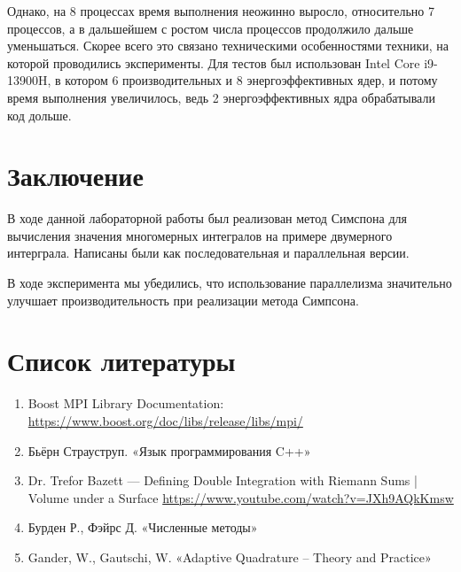 \documentclass[12pt,a4paper]{article}
\begin{document}
Однако, на 8 процессах время выполнения неожинно выросло, относительно 7 процессов, а в дальшейшем с ростом числа процессов продолжило дальше уменьшаться. Скорее всего это связано техническими особенностями техники, на которой проводились эксперименты. Для тестов был использован Intel Core i9-13900H, в котором 6 производительных и 8 энергоэффективных ядер, и потому время выполнения увеличилось, ведь 2 энергоэффективных ядра обрабатывали код дольше.

\section*{Заключение}

В ходе данной лабораторной работы был реализован метод Симспона для вычисления значения многомерных интегралов на примере двумерного интерграла. Написаны были как последовательная и параллельная версии.

В ходе эксперимента мы убедились, что использование параллелизма значительно улучшает производительность при реализации метода Симпсона.

\newpage
\section*{Список литературы}


\begin{enumerate}
    \item Boost MPI Library Documentation: 
    \url{https://www.boost.org/doc/libs/release/libs/mpi/}
    \item Бьёрн Страуструп. «Язык программирования C++»
    \item Dr. Trefor Bazett --- Defining Double Integration with Riemann Sums | Volume under a Surface
    \url{https://www.youtube.com/watch?v=JXh9AQkKmsw}
    \item Бурден Р., Фэйрс Д. «Численные методы»
    \item Gander, W., Gautschi, W. «Adaptive Quadrature – Theory and Practice»
\end{enumerate}

\newpage
\end{document}
